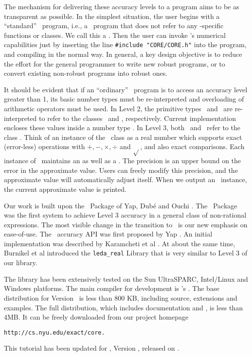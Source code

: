 \documentclass[12pt]{article}
\begin{document}
The mechanism for delivering these
accuracy levels to a program aims to be as transparent
as possible.  In the simplest situation,
the user begins with a ``standard'' \cpp\ program,
i.e., a \cpp\ program that does not refer to any 
\core-specific functions or classes.  We call this
a .  Then the user
can invoke \corelib's numerical capabilities just
by inserting the line {\tt \#include "CORE/CORE.h"} into the
program, and compiling in the normal way.
In general, a key design objective is to reduce the effort
for the general programmer to write new robust programs,
or to convert existing non-robust programs into robust ones.

It should be evident that if an ``ordinary'' \cpp\ program
is to access an accuracy level greater than 1,
its basic number types must be re-interpreted and overloading
of arithmetic operators must be used.  In Level 2, the
primitive types \double\ and \lng\ are re-interpreted to refer
to the classes \BF\ and \Int, respectively.  Current
implementation encloses these values inside a number type \real.
In Level 3, both \double\ and \lng\ refer to the class \expr.
Think of an instance of the
\expr\ class as a real number which supports exact (error-less)
operations with $+,-,\times, \div$ and $\sqrt{}$,
and also exact comparisons.
Each instance of \expr\ maintains an 
as well as a .   The precision is an
upper bound on the error in the approximate value.
Users can freely modify this precision, and
the approximate value will automatically adjust itself.
When we output an \expr\ instance, the current approximate
value is printed.

Our work is built upon the \rexpr\ Package
of Yap, Dub\'e and Ouchi \cite{yap-dube:paradigm}.
The \rexpr\ Package was the
first system to achieve Level 3 accuracy
in a general class of non-rational expressions.
The most visible change in the transition to \corelib\
is our new emphasis on ease-of-use.
The \core\ accuracy API was first proposed by
Yap \cite{yap:brown-cgc:98}.  An initial implementation
was described by Karamcheti et al \cite{klpy:core:98}.
At about the same time, Burnikel et al \cite{bfms:easy:99}
introduced the {\tt leda\_real} Library that is
very similar to Level 3 of our library.

The library has been extensively tested
on the Sun UltraSPARC, Intel/Linux and Windows platforms.
The main compiler for development is \gnu's \gpp.
The base distribution for Version \versionNo\ is less than 800 KB, 
including source, extensions and examples.
The full distribution, which includes documentation and \gmp,
is less than 4MB.
It can be freely downloaded from our project homepage
	\begin{center}
	\verb+http://cs.nyu.edu/exact/core.+
	\end{center}
This tutorial has been updated for \corelib, Version \versionNo,
released on \releaseDate.
\end{document}
